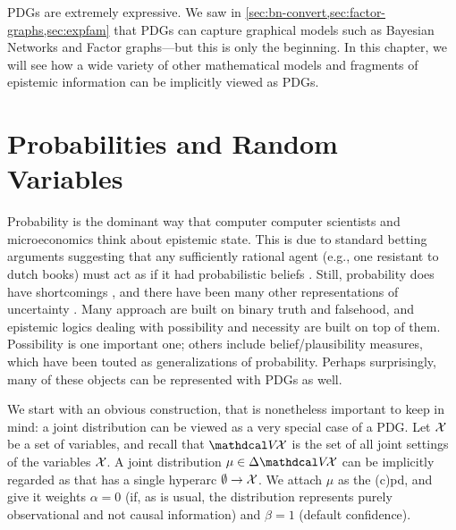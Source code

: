     \label{chap:repr-tools}

PDGs are extremely expressive.
We saw in \cref{sec:bn-convert,sec:factor-graphs,sec:expfam} that PDGs
can capture graphical models such as Bayesian Networks and Factor graphs---but this is only the beginning. 
%
In this chapter, we will see how a wide variety of other mathematical models and fragments of epistemic information can be implicitly viewed as PDGs.


\section{Probabilities and Random Variables}
    \label{sec:prob-as-pdg}

Probability is the dominant way that computer computer scientists and
microeconomics think about epistemic state.
This is due to standard betting arguments suggesting that any sufficiently rational agent (e.g., one resistant to dutch books)
must act as if it had probabilistic beliefs \cite{..,savage}.
Still, probability does have shortcomings \cite{}, and there have been many other representations of uncertainty \cite{halpern2017reasoning}.
Many approach are built on binary truth and falsehood, and epistemic logics dealing with possibility and necessity are built on top of them.
Possibility is one important one; others include belief/plausibility measures, which have been touted as generalizations of probability. 
Perhaps surprisingly, many of these objects can be represented with PDGs as well.

We start with an obvious construction, that is nonetheless important
to keep in mind: a joint distribution can be viewed as a very special case of a PDG. 
Let $\mathcal X$ be a set of variables, and recall that $\V\!\X$ is the set of all joint settings of the variables $\mathcal X$. 
A joint distribution $\mu \in \Delta \V\!\X$ can be implicitly regarded as that has a single hyperarc $\emptyset \to \mathcal X$. We attach $\mu$ as the (c)pd, and give it weights $\alpha=0$ (if, as is usual, the distribution represents purely observational and not causal information) and $\beta = 1$ (default confidence). 


